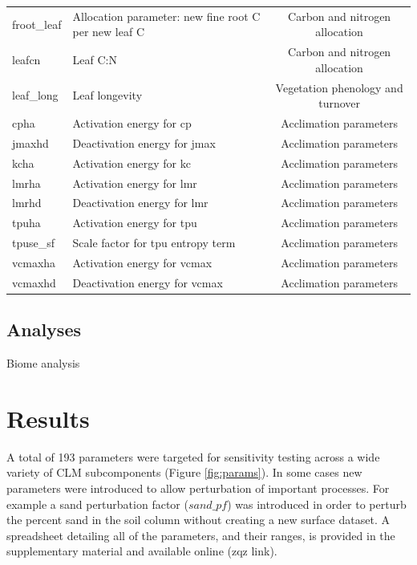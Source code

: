 \documentclass[draft]{agujournal2019}
\begin{document}
\begin{landscape}
\begin{table}[h]
\begin{tabular}{l l c}
froot\_leaf & Allocation parameter: new fine root C per new leaf C & Carbon and nitrogen allocation \\
leafcn & Leaf C:N & Carbon and nitrogen allocation \\
leaf\_long & Leaf longevity & Vegetation phenology and turnover \\
cpha & Activation energy for cp & Acclimation parameters \\
jmaxhd & Deactivation energy for jmax & Acclimation parameters \\
kcha & Activation energy for kc & Acclimation parameters \\
lmrha & Activation energy for lmr & Acclimation parameters \\
lmrhd & Deactivation energy for lmr & Acclimation parameters \\
tpuha & Activation energy for tpu & Acclimation parameters \\
tpuse\_sf & Scale factor for tpu entropy term & Acclimation parameters \\
vcmaxha & Activation energy for vcmax & Acclimation parameters \\
vcmaxhd & Deactivation energy for vcmax & Acclimation parameters \\
 \hline
 \end{tabular}
 \end{table}
\end{landscape}


\subsection{Analyses}

Biome analysis

\section{Results}

A total of 193 parameters were targeted for sensitivity testing across a wide variety of CLM subcomponents (Figure \ref{fig:params}). In some cases new parameters were introduced to allow perturbation of important processes. For example a sand perturbation factor ($sand\_pf$) was introduced in order to perturb the percent sand in the soil column without creating a new surface dataset.  A spreadsheet detailing all of the parameters, and their ranges, is provided in the supplementary material and available online (zqz link).
\end{document}
